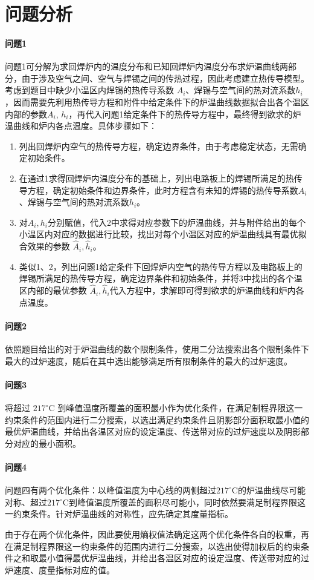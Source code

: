 \documentclass[../main.tex]{subfiles}
\begin{document}
\section{问题分析}

\paragraph{问题1}
问题1可分解为求回焊炉内的温度分布和已知回焊炉内温度分布求炉温曲线两部分，由于涉及空气之间、空气与焊锡之间的传热过程，因此考虑建立热传导模型。考虑到题目中缺少小温区内焊锡的热传导系数 \(A_i\)、焊锡与空气间的热对流系数\(h_i\)，因而需要先利用热传导方程和附件中给定条件下的炉温曲线数据拟合出各个温区内部的参数\(A_{i}\), \(h_{i}\)，再代入问题1给定条件下的热传导方程中，最终得到欲求的炉温曲线和炉内各点温度。具体步骤如下：
\begin{enumerate}
\item 列出回焊炉内空气的热传导方程，确定边界条件，由于考虑稳定状态，无需确定初始条件。
\item 在通过1求得回焊炉内温度分布的基础上，列出电路板上的焊锡所满足的热传导方程，确定初始条件和边界条件，此时方程含有未知的焊锡的热传导系数\(A_{i}\)、焊锡与空气间的热对流系数\(h_{i}\)。
\item 对\(A_{i}, h_{i}\)分别赋值，代入2中求得对应参数下的炉温曲线，并与附件给出的每个小温区内对应的数据进行比较，找出对每个小温区对应的炉温曲线具有最优拟合效果的参数 \(\hat A _{i} , \hat h_{i}\)。
\item 类似1、2，列出问题1给定条件下回焊炉内空气的热传导方程以及电路板上的焊锡所满足的热传导方程，确定边界条件和初始条件，并将3中找出的各个温区内部的最优参数 \(\hat A _{i} , \hat h _{i}\)代入方程中，求解即可得到欲求的炉温曲线和炉内各点温度。
\end{enumerate}

\paragraph{问题2}
依照题目给出的对于炉温曲线的数个限制条件，使用二分法搜索出各个限制条件下最大的过炉速度，随后在其中选出能够满足所有限制条件的最大的过炉速度。

\paragraph{问题3}
将超过 \(217 ^{\circ}\mathrm{C}\) 到峰值温度所覆盖的面积最小作为优化条件，在满足制程界限这一约束条件的范围内进行二分搜索，以选出满足约束条件且阴影部分面积取最小值的最优炉温曲线，并给出各温区对应的设定温度、传送带对应的过炉速度以及阴影部分对应的最小面积。

\paragraph{问题4}
问题四有两个优化条件：以峰值温度为中心线的两侧超过\(217 ^{\circ}\mathrm{C}\)的炉温曲线尽可能对称、超过\(217 ^{\circ}\mathrm{C}\)到峰值温度所覆盖的面积尽可能小，同时依然要满足制程界限这一约束条件。针对炉温曲线的对称性，应先确定其度量指标。

由于存在两个优化条件，因此要使用熵权值法确定这两个优化条件各自的权重，再在满足制程界限这一约束条件的范围内进行二分搜索，以选出使得加权后的约束条件之和取最小值得最优炉温曲线，并给出各温区对应的设定温度、传送带对应的过炉速度、度量指标对应的值。
\end{document}
